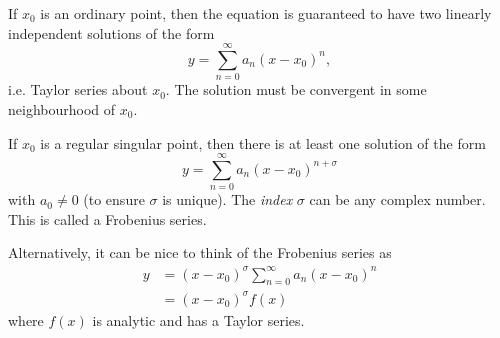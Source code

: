 \documentclass[a4paper]{article}
\begin{document}
If $x_0$ is an ordinary point, then the equation is guaranteed to have two linearly independent solutions of the form 
\[
y = \sum_{n = 0}^\infty a_n(x - x_0)^n,
\]
i.e. Taylor series about $x_0$. The solution must be convergent in some neighbourhood of $x_0$.

If $x_0$ is a regular singular point, then there is at least one solution of the form 
\[
y = \sum_{n = 0}^\infty a_n(x - x_0)^{n + \sigma}
\]
with $a_0 \not= 0$ (to ensure $\sigma$ is unique). The \emph{index} $\sigma$ can be any complex number. This is called a Frobenius series.

Alternatively, it can be nice to think of the Frobenius series as 
\begin{align*}
  y &= (x - x_0)^\sigma \sum_{n = 0}^\infty a_n (x - x_0)^n\\
  &= (x-x_0)^\sigma f(x)
\end{align*}
where $f(x)$ is analytic and has a Taylor series.
\end{document}
